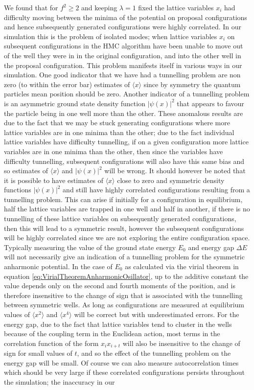 \documentclass[12pt]{article}
\begin{document}
    We found that for $f^2\geq2$ and keeping $\lambda =1 $ fixed the lattice variables $x_i$ had difficulty moving between the minima of the potential on proposal configurations and hence subsequently generated configurations were highly correlated. In our simulation this is the problem of isolated modes; when lattice variables $x_i$ on subsequent configurations in the HMC algorithm have been unable to move out of the well they were in in the original configuration, and into the other well in the proposal configuration. This problem manifests itself in various ways in our simulation. One good indicator that we have had a tunnelling problem are non zero (to within the error bar) estimates of $\langle x \rangle$ since by symmetry the quantum particles mean position should be zero. Another indicator of a tunnelling problem is an asymmetric ground state density function $|\psi\left(x\right)|^2$ that appears to favour the particle being in one well more than the other. These anomalous results are due to the fact that we may be stuck generating configurations where more lattice variables are in one minima than the other; due to the fact individual lattice variables have difficulty tunnelling, if on a given configuration more lattice variables are in one minima than the other, then since the variables have difficulty tunnelling, subsequent configurations will also have this same bias and so estimates of $\langle x \rangle$ and $|\psi\left(x\right)|^2$ will be wrong. It should however be noted that it is possible to have estimates of $\langle x \rangle$ close to zero and symmetric density functions $|\psi\left(x\right)|^2$ and still have highly correlated configurations resulting from a tunnelling problem. This can arise if initially for a configuration in equilibrium, half the lattice variables are trapped in one well and half in another, if there is no tunnelling of these lattice variables on subsequently generated configurations, then this will lead to a symmetric result, however the subsequent configurations will be highly correlated since we are not exploring the entire configuration space. Typically measuring the value of the ground state energy $E_0$ and energy gap  $\Delta E$ will not necessarily give an indication of a tunnelling problem for the symmetric anharmonic potential. In the case of $E_0$ as calculated via the virial theorem in equation \ref{eq:VirialTheoremAnharmonicOsillator}, up to the additive constant the value depends only on the second and fourth moments of the position, and is therefore insensitive to the change of sign that is associated with the tunnelling between symmetric wells. As long as configurations are measured at equilibrium values of $\langle x^2 \rangle$ and $\langle x^4 \rangle$ will be correct but with underestimated errors. For the energy gap, due to the fact that lattice variables tend to cluster in the wells because of the coupling term in the Euclidean action, most terms in the correlation function of the form $x_ix_{i+t}$ will also be insensitive to the change of sign for small values of $t$, and so the effect of the tunnelling problem on the energy gap will be small. Of course we can also measure autocorrelation times which should be very large if these correlated configurations persists throughout the simulation; the inaccuracy in our 
\end{document}
